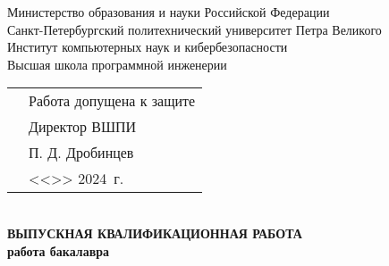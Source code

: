 \begin{titlepage}

  \begin{center} %




    Министерство образования и науки Российской Федерации\\
    Санкт-Петербургский политехнический университет Петра Великого\\
    Институт компьютерных наук и кибербезопасности\\
    Высшая школа программной инженерии\\[0.9cm]


    \begin{minipage}{\linewidth}
      \begin{tabularx}{\linewidth}{X@{}l@{}}
         & Работа допущена к защите                                                               \\
         & Директор ВШПИ                                                                          \\
         & \underline{\hspace*{0.1\textheight}} П. Д. Дробинцев                                   \\
         & <<\underline{\hspace*{0.05\textheight}}>> \underline{\hspace*{0.1\textheight}} 2024~г. \\
      \end{tabularx}
    \end{minipage}\\[1.5cm]

    {\Large \bfseries ВЫПУСКНАЯ КВАЛИФИКАЦИОННАЯ РАБОТА}\\
    {\Large \bfseries работа бакалавра}\\[0.7cm]

    \bigskip
    \bigskip

    {\Large \bfseries \MakeUppercase{\Theme}}\\[0.4cm] %


\end{center}
\end{titlepage}
